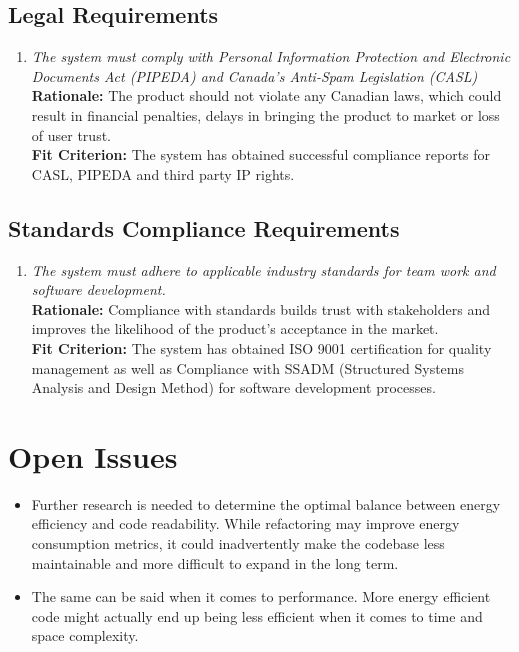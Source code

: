 \documentclass[12pt]{article}
\begin{document}
\subsection{Legal Requirements}
\begin{enumerate}[label=CR-LR \arabic*., wide=0pt, leftmargin=*]
	\item \emph{The system must comply with Personal Information Protection and Electronic Documents Act (PIPEDA) and Canada’s Anti-Spam Legislation (CASL)}\\
    {\bf Rationale:} The product should not violate any Canadian laws, which could result in  financial penalties, delays in bringing the product to market or loss of user trust.\\
    {\bf Fit Criterion:} The system has obtained successful compliance reports for CASL, PIPEDA and third party IP rights.
\end{enumerate}
\subsection{Standards Compliance Requirements}
\begin{enumerate}[label=CR-SCR \arabic*., wide=0pt, leftmargin=*]
	\item \emph{The system must adhere to applicable industry standards for team work and software development.}\\
    {\bf Rationale:} Compliance with standards builds trust with stakeholders and improves the likelihood of the product’s acceptance in the market.\\
    {\bf Fit Criterion:} The system has obtained ISO 9001 certification for quality management as well as Compliance with SSADM (Structured Systems Analysis and Design Method) for software development processes.
\end{enumerate}

\section{Open Issues}
\begin{itemize}
  \item Further research is needed to determine the optimal balance between energy efficiency and code readability. While refactoring may improve energy consumption metrics, it could inadvertently make the codebase less maintainable and more difficult to expand in the long term.
  \item The same can be said when it comes to performance. More energy efficient code might actually end up being less efficient when it comes to time and space complexity.
\end{itemize}
\end{document}
